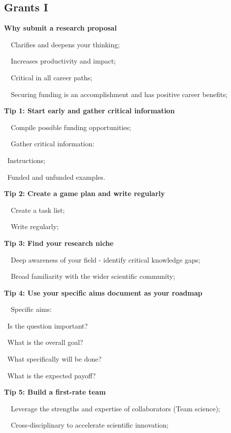 \documentclass[a4paper, 12pt]{article}
\begin{document}
\newpage\subsection{Grants I}

\textbf{Why submit a research proposal}
\par\ \textbullet\ Clarifies and deepens your thinking;
\par\ \textbullet\ Increases productivity and impact;
\par\ \textbullet\ Critical in all career paths;
\par\ \textbullet\ Securing funding is an accomplishment and has positive career benefits;

\textbf{Tip 1: Start early and gather critical information}
\par\ \textbullet\ Compile possible funding opportunities;
\par\ \textbullet\ Gather critical information:
\par\quad\textopenbullet\ Instructions;
\par\quad\textopenbullet\ Funded and unfunded examples.

\textbf{Tip 2: Create a game plan and write regularly}
\par\ \textbullet\ Create a task list;
\par\ \textbullet\ Write regularly;

\textbf{Tip 3: Find your research niche}
\par\ \textbullet\ Deep awareness of your field - identify critical knowledge gaps;
\par\ \textbullet\ Broad familiarity with the wider scientific community;

\textbf{Tip 4: Use your specific aims document as your roadmap}
\par\ \textbullet\ Specific aims:
\par\quad\textopenbullet\ Is the question important?
\par\quad\textopenbullet\ What is the overall goal?
\par\quad\textopenbullet\ What specifically will be done?
\par\quad\textopenbullet\ What is the expected payoff?

\textbf{Tip 5: Build a first-rate team}
\par\ \textbullet\ Leverage the strengths and expertise of collaborators (Team science);
\par\ \textbullet\ Cross-disciplinary to accelerate scientific innovation;
\end{document}
